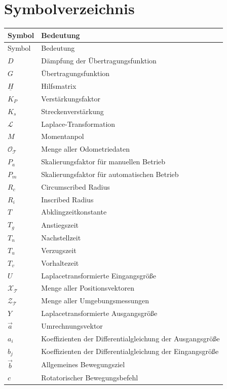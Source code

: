 \documentclass[12pt,a4paper,oneside,numbers=noenddot,headsepline,captions=tableheading,toc=bibliography,openany,tikz,margin=5mm]{scrbook}
\begin{document}
	\chapter*{Symbolverzeichnis}
	
	\begin{longtable}{p{3cm}p{8cm}}
		\setlength\tabcolsep{9pt}
		Symbol & Bedeutung \\ \hline
		\endfirsthead
		Symbol & Bedeutung \\ \hline
		
		\endhead
		\toprule
		$D$&Dämpfung der Übertragungsfunktion\\
		$G$&Übertragungsfunktion\\
		$\underline{H}$&Hilfsmatrix\\
		$K_{P}$&Verstärkungsfaktor\\
		$K_{s}$&Streckenverstärkung\\
		$\mathcal{L}$&Laplace-Transformation\\
		$M$&Momentanpol\\
		$\mathcal{{O}_{T}}$&Menge aller Odometriedaten\\
		$P_a$&Skalierungsfaktor für manuellen Betrieb\\
		$P_m$&Skalierungsfaktor für automatischen Betrieb \\
		$R_{c}$&Circumscribed Radius\\
		$R_{i}$&Inscribed Radius\\
		$T$&Abklingzeitkonstante\\
		$T_{g}$&Anstiegszeit\\
		$T_{n}$&Nachstellzeit\\
		$T_{u}$&Verzugszeit\\
		$T_{v}$&Vorhaltezeit\\
		$U$&Laplacetransformierte Eingangsgröße\\
		$\mathcal{X_{T}}$&Menge aller Positionsvektoren\\
		$\mathcal{Z_{T}}$&Menge aller Umgebungsmessungen\\
		$Y$&Laplacetransformierte Ausgangsgröße\\
		$\vec{a}$&Umrechnungsvektor\\
		$a_{i}$&Koeffizienten der Differentialgleichung der Ausgangsgröße\\
		$b_{j}$&Koeffizienten der Differentialgleichung der Eingangsgröße\\
		$\vec{b}$&Allgemeines Bewegungsziel\\
		$c$& Rotatorischer Bewegungsbefehl \\

\end{longtable}
\end{document}
